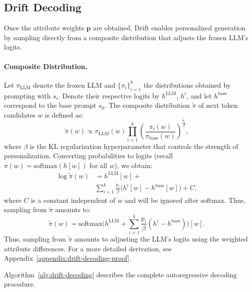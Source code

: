 \subsection{Drift Decoding}
\label{sec:drift-decoding}
Once the attribute weights $\mathbf{p}$ are obtained, Drift enables personalized generation by sampling directly from a composite distribution that adjusts the frozen LLM’s logits.
\paragraph{Composite Distribution.}  
Let $\pi_{\text{LLM}}$ denote the frozen LLM and $\{\pi_i\}_{i=1}^k$ the distributions obtained by prompting with $s_i$. Denote their respective logits by $h^{\text{LLM}}$, $h^i$, and let $h^{\text{base}}$ correspond to the base prompt $s_0$. The composite distribution $\tilde{\pi}$ of next token candidates $w$ is defined as:
\begin{equation}
    \tilde{\pi}(w) \propto \pi_{\text{LLM}}(w) \prod_{i=1}^k \left(\frac{\pi_i(w)}{\pi_{\text{base}}(w)}\right)^{\frac{p_i}{\beta}},
\end{equation}
where $\beta$ is the KL regularization hyperparameter that controls the strength of personalization.
Converting probabilities to logits (recall $\pi(w)=\text{softmax}(h[w])$ for all $w$), we obtain:
\begin{equation}
\begin{split}
    \log \tilde{\pi}(w) &= h^{\text{LLM}}[w] + \\ &\sum_{i=1}^k \frac{p_i}{\beta} \big(h^i[w] - h^{\text{base}}[w]\big) + C,
    \end{split}
\end{equation}
where $C$ is a constant independent of $w$ and will be ignored after $\text{softmax}$. Thus, sampling from $\tilde{\pi}$ amounts to:
{\small
\begin{equation}
    \tilde{\pi}(w) = \text{softmax}\Big( h^{\text{LLM}} + \sum_{i=1}^k \frac{p_i}{\beta} (h^i - h^{\text{base}}) \Big)[w].
\end{equation}}
Thus, sampling from $\tilde{\pi}$ amounts to adjusting the LLM's logits using the weighted attribute differences.
For a more detailed derivation, see Appendix~\ref{appendix:drift-decoding-proof}.

Algorithm~\ref{alg:drift-decoding} describes the complete autoregressive decoding procedure.


